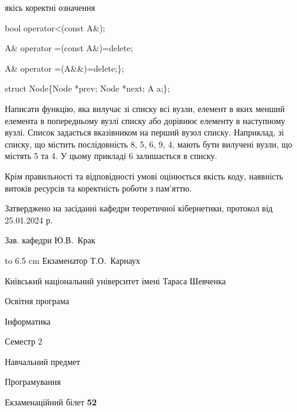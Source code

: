 \documentclass[12pt, ukrainian]{article}
\begin{document}
{\quad  якісь коректні означення 

\quad  bool operator<(const A\&); 

\quad A\& operator =(const A\&)=delete; 

\quad  A\& operator =(A\&\&)=delete;\};

struct Node\{Node *prev; Node *next; A a;\};

Написати функцію, яка вилучає зі списку всі вузли, елемент в яких менший елемента в попередньому вузлі списку або дорівнює елементу в наступному вузлі. Список задається вказівником на перший вузол списку. Наприклад, зі списку, що містить послідовність 8, 5, 6, 9, 4, мають бути вилучені вузли, що містять 5 та 4. У цьому прикладі 6 залишається в списку.

Крім правильності та відповідності умові оцінюється якість коду, наявність витоків ресурсів та коректність роботи з пам'яттю. 

}
{\smallskip\smallskip \begin {scriptsize} Затверджено на засіданні кафедри теоретичної кібернетики, протокол   від   25.01.2024 р.\par\smallskip\smallskip\smallskip\smallskip
{\parbox {6.5 cm} {Зав. кафедри \dotfill Ю.В.~Крак}}\hspace {0.7cm} {\hbox to 6.5 cm { Екзаменатор \dotfill Т.О.~Карнаух}} \end{scriptsize}}
\newpage
{{\begin {scriptsize}\par
{ \center  Київський національний університет імені Тараса Шевченка \par}
{\parbox {5 cm}{Освітня програма \hfill}{\parbox {7 cm}{Інформатика\hfill}}\parbox {6 cm}{\hfill Семестр 2}}\par
{\parbox {5 cm} {Навчальний предмет \hfill}\parbox {7 cm}{Програмування \hfill}\parbox {6cm}{\hfill}\par}\vspace{-15pt} \end{scriptsize}}{\center Екзаменаційний білет \No \textbf { 52 }\par}}
\end{document}
